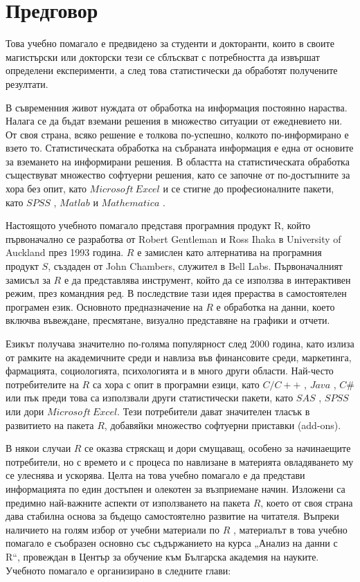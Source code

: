 ﻿\newpage
{}
\chapter*{Предговор}
\setcounter{page}{1}
\thispagestyle{empty}

Това учебно помагало е предвидено за студенти и докторанти, които в своите магистърски или докторски тези се сблъскват с потребността да извършат определени експерименти, а след това статистически да обработят получените резултати.

В съвременния живот нуждата от обработка на информация постоянно нараства. Налага се да бъдат вземани решения в множество ситуации от ежедневието ни. От своя страна, всяко решение е толкова по-успешно, колкото по-информирано е взето то. Статистическата обработка на събраната информация е една от основите за вземането на информирани решения. В областта на статистическата обработка съществуват множество софтуерни решения, като се започне от по-достъпните за хора без опит, като $Microsoft\ Excel$ и се стигне до професионалните пакети, като $SPSS$ \cite{spss}, $Matlab$ \cite{matlab} и $Mathematica$ \cite{mathematica}.

Настоящото учебното помагало представя програмния продукт R, който първоначално се разработва от Robert Gentleman и Ross Ihaka в University of Auckland през 1993 година. $R$ е замислен като алтернатива на програмния продукт $S$, създаден от John Chambers, служител в Bell Labs. Първоначалният замисъл за $R$ е да представлява инструмент, който да се използва в интерактивен режим, през командния ред. В последствие тази идея прераства в самостоятелен програмен език. Основното предназначение на $R$ е обработка на данни, което включва въвеждане, пресмятане, визуално представяне на графики и отчети.

Езикът получава значително по-голяма популярност след 2000 година, като излиза от рамките на академичните среди и навлиза във финансовите среди, маркетинга, фармацията, социологията, психологията и в много други области. Най-често потребителите на $R$ са хора с опит в програмни езици, като $C/C++$ \cite{cpp}, $Java$ \cite{java}, $C\#$ \cite{csharp} или пък преди това са използвали други статистически пакети, като $SAS$ \cite{sas}, $SPSS$ или дори $Microsoft\ Excel$. Тези потребители дават значителен тласък в развитието на пакета $R$, добавяйки множество софтуерни приставки (add-ons).

В някои случаи $R$ се оказва стряскащ и дори смущаващ, особено за начинаещите потребители, но с времето и с процеса по навлизане в материята овладяването му се улеснява и ускорява. Целта на това учебно помагало е да представи информацията по един достъпен и олекотен за възприемане начин. Изложени са предимно най-важните аспекти от използването на пакета $R$, което от своя страна дава стабилна основа за бъдещо самостоятелно развитие на читателя. Въпреки наличието на голям избор от учебни материали по $R$ \cite{r01,r02,r03,r04,r05,r06,r07,r08,r09,r10}, материалът в това учебно помагало е съобразен основно със съдържанието на курса „Анализ на данни с R“, провеждан в Център за обучение към Българска академия на науките. Учебното помагало е организирано в следните глави:

